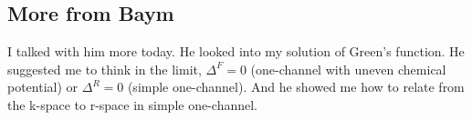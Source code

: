 \subsection{More from Baym}
I talked with him more today.  He looked into my solution of Green's function.  He suggested me to think in the limit, $\Delta^F=0$ (one-channel with uneven chemical potential) or $\Delta^R=0$ (simple one-channel).  And he showed me how to relate from the k-space to r-space in simple one-channel.  

